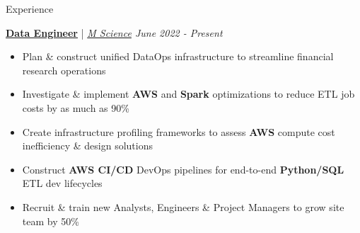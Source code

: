 \documentclass{resume/resume}
\begin{document}
\begin{rSection}{Experience}

  \href{https://www.linkedin.com/posts/m-science-llc_how-m-science-uses-databricks-structured-activity-6953752015013363713-EOTN/}{\bf Data Engineer} | {\em \href{https://mscience.com}{M Science} \hfill June 2022 - Present}
  \vspace{-6pt}
  \begin{itemize}[nosep]
    \item Plan \& construct unified DataOps infrastructure to streamline financial research operations
    \item Investigate \& implement {\bf AWS} and {\bf Spark} optimizations to reduce ETL job costs by as much as 90\%
    \item Create infrastructure profiling frameworks to assess {\bf AWS} compute cost inefficiency \& design solutions
    \item Construct {\bf AWS CI/CD} DevOps pipelines for end-to-end {\bf Python/SQL} ETL dev lifecycles
    \item Recruit \& train new Analysts, Engineers \& Project Managers to grow site team by 50\%
  \end{itemize}
  

\end{rSection}
\end{document}
